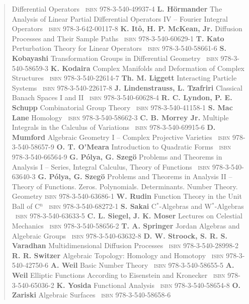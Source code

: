 \begin{quote}
Differential Operators \ \textsc{isbn} 978-3-540-49937-4
\textbf{L. Hörmander} The Analysis of Linear Partial Differential Operators IV -- Fourier
Integral Operators \ \textsc{isbn} 978-3-642-00117-8
\textbf{K. It\^o, H. P. McKean, Jr.} Diffusion Processes and Their Sample Paths \ \textsc{isbn} 978-3-540-60629-1
\textbf{T. Kato} Perturbation Theory for Linear Operators \ \textsc{isbn} 978-3-540-58661-6
\textbf{S. Kobayashi} Transformation Groups in Differential Geometry \ \textsc{isbn} 978-3-540-58659-3
\textbf{K. Kodaira} Complex Manifolds and Deformation of Complex Structures \ \textsc{isbn} 978-3-540-22614-7
\textbf{Th. M. Liggett} Interacting Particle Systems \ \textsc{isbn} 978-3-540-22617-8
\textbf{J. Lindenstrauss, L. Tzafriri} Classical Banach Spaces I and II \ \textsc{isbn} 978-3-540-60628-4
\textbf{R. C. Lyndon, P. E. Schupp} Combinatorial Group Theory \ \textsc{isbn} 978-3-540-41158-1
\textbf{S. Mac Lane} Homology \ \textsc{isbn} 978-3-540-58662-3
\textbf{C. B. Morrey Jr.} Multiple Integrals in the Calculus of Variations \ \textsc{isbn} 978-3-540-69915-6
\textbf{D. Mumford} Algebraic Geometry I -- Complex Projective Varieties \ \textsc{isbn} 978-3-540-58657-9
\textbf{O. T. O'Meara} Introduction to Quadratic Forms \ \textsc{isbn} 978-3-540-66564-9
\textbf{G. Pólya, G. Szegö} Problems and Theorems in Analysis I -- Series, Integral Calculus,
Theory of Functions \ \textsc{isbn} 978-3-540-63640-3
\textbf{G. Pólya, G. Szegö} Problems and Theorems in Analysis II -- Theory of Functions. Zeros.
Polynomials. Determinants. Number Theory. Geometry
\hfill \textsc{isbn} 978-3-540-63686-1
\textbf{W. Rudin} Function Theory in the Unit Ball of C$^{\mathrm{n}}$ \ \textsc{isbn} 978-3-540-68272-1
\textbf{S. Sakai} C$^*$-Algebras and W$^*$-Algebras \ \textsc{isbn} 978-3-540-63633-5
\textbf{C. L. Siegel, J. K. Moser} Lectures on Celestial Mechanics \ \textsc{isbn} 978-3-540-58656-2
\textbf{T. A. Springer} Jordan Algebras and Algebraic Groups \ \textsc{isbn} 978-3-540-63632-8
\textbf{D. W. Stroock, S. R. S. Varadhan} Multidimensional Diffusion Processes \ \textsc{isbn} 978-3-540-28998-2
\textbf{R. R. Switzer} Algebraic Topology: Homology and Homotopy \ \textsc{isbn} 978-3-540-42750-6
\textbf{A. Weil} Basic Number Theory \ \textsc{isbn} 978-3-540-58655-5
\textbf{A. Weil} Elliptic Functions According to Eisenstein and Kronecker \ \textsc{isbn} 978-3-540-65036-2
\textbf{K. Yosida} Functional Analysis \ \textsc{isbn} 978-3-540-58654-8
\textbf{O. Zariski} Algebraic Surfaces \ \textsc{isbn} 978-3-540-58658-6
\end{quote}
